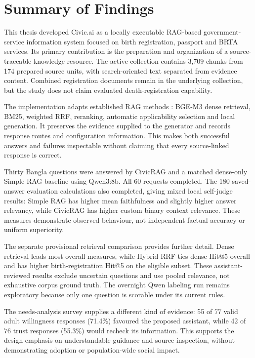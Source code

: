 \section{Summary of Findings}
This thesis developed Civic.ai as a locally executable RAG-based government-service information system focused on birth registration, passport and BRTA services. Its primary contribution is the preparation and organization of a source-traceable knowledge resource. The active collection contains 3,709 chunks from 174 prepared source units, with search-oriented text separated from evidence content. Combined registration documents remain in the underlying collection, but the study does not claim evaluated death-registration capability.

The implementation adapts established RAG methods \cite{lewis2020rag,nextrag}: BGE-M3 dense retrieval, BM25, weighted RRF, reranking, automatic applicability selection and local generation. It preserves the evidence supplied to the generator and records response routes and configuration information. This makes both successful answers and failures inspectable without claiming that every source-linked response is correct.

Thirty Bangla questions were answered by CivicRAG and a matched dense-only Simple RAG baseline using Qwen3:8b. All 60 requests completed. The 180 saved-answer evaluation calculations also completed, giving mixed local self-judge results: Simple RAG has higher mean faithfulness and slightly higher answer relevancy, while CivicRAG has higher custom binary context relevance. These measures demonstrate observed behaviour, not independent factual accuracy or uniform superiority.

The separate provisional retrieval comparison provides further detail. Dense retrieval leads most overall measures, while Hybrid RRF ties dense Hit@5 overall and has higher birth-registration Hit@5 on the eligible subset. These assistant-reviewed results exclude uncertain questions and use pooled relevance, not exhaustive corpus ground truth. The overnight Qwen labeling run remains exploratory because only one question is scorable under its current rules.

The needs-analysis survey supplies a different kind of evidence: 55 of 77 valid adult willingness responses (71.4\%) favoured the proposed assistant, while 42 of 76 trust responses (55.3\%) would recheck its information. This supports the design emphasis on understandable guidance and source inspection, without demonstrating adoption or population-wide social impact.

